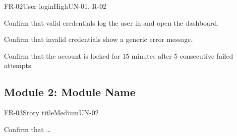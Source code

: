 \begin{userstory}{FR-02}{User login}{High}{UN-01, R-02}
  \begin{confirmation}
    \item Confirm that valid credentials log the user in and open the dashboard.
    \item Confirm that invalid credentials show a generic error message.
    \item Confirm that the account is locked for 15 minutes after 5 consecutive failed attempts.
  \end{confirmation}
\end{userstory}

\subsection{Module 2: Module Name}

\begin{userstory}{FR-03}{Story title}{Medium}{UN-02}
  \begin{confirmation}
    \item Confirm that \ldots
  \end{confirmation}
\end{userstory}
%

